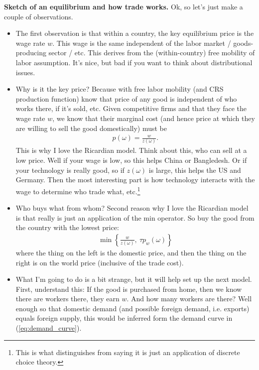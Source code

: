 \documentclass[pdftex,12pt]{article}
\begin{document}
\medskip
\noindent \textbf{Sketch of an equilibrium and how trade works.} Ok, so let's just make a couple of observations.

\begin{itemize}
\item The first observation is that within a country, the key equilibrium price is the wage rate $w$. This wage is the same independent of the labor market / goods-producing sector / etc. This derives from the (within-country) free mobility of labor assumption. It's nice, but bad if you want to think about distributional issues.
    
\item Why is it the key price? Because with free labor mobility (and CRS production function) know that price of any good is independent of who works there, if it's sold, etc. Given competitive firms and that they face the wage rate $w$, we know that their marginal cost (and hence price at which they are willing to sell the good domestically) must be
    \begin{align}
    p(\omega) = \frac{w}{z(\omega)}.
    \label{eq:ek_wage}
    \end{align}
    This is why I love the Ricardian model. Think about this, who can sell at a low price. Well if your wage is low, so this helps China or Bangledesh. Or if your technology is really good, so if $z(\omega)$ is large, this helps the US and Germany. Then the most interesting part is how technology interacts with the wage to determine who trade what, etc.\footnote{This is what distinguishes \citet{eaton2002technology} from saying it is just an application of discrete choice theory.} 

\item Who buys what from whom? Second reason why I love the Ricardian model is that really is just an application of the min operator. So buy the good from the country with the lowest price:
    \begin{align}
    \min\left\{ \frac{w}{z(\omega)} , \ \tau p_w(\omega) \right\}
    \end{align}
where the thing on the left is the domestic price, and then the thing on the right is on the world price (inclusive of the trade cost).

\item What I'm going to do is a bit strange, but it will help set up the next model. First, understand this:  If the good is purchased from home, then we know there are workers there, they earn $w$. And how many workers are there? Well enough so that domestic demand (and possible foreign demand, i.e. exports) equals foreign supply, this would be inferred form the demand curve in (\ref{eq:demand_curve}).


\end{itemize}
\end{document}
